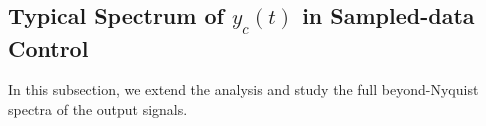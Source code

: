 \documentclass [11pt, proquest] {uwthesis}[2020/02/24]
\begin{document}
\subsection{\label{subsec:Typical-spectrum-of}Typical Spectrum of $y_{c}(t)$
in Sampled-data Control}

In this subsection, we extend the analysis and study the full beyond-Nyquist
spectra of the output signals.
\begin{figure}[!ht]
\begin{centering}
\par\end{centering}
\begin{centering}
\subfloat[\label{fig:;-with-enhanced}$d_{c}(t)=\cos(\Omega_{o}t)$ with enhanced
discrete-time high-gain control at $\Omega_{o}$ ]{\begin{centering}

\end{centering}}
\end{centering}
\end{figure}
\end{document}
